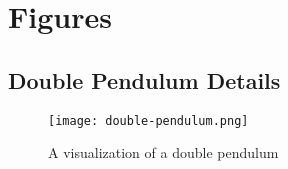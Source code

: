 \section{Figures}\label{sec:figures}

\subsection{Double Pendulum Details}\label{subsec:double-pendulum-details}
\begin{figure}[H]
    \centering
    \texttt{[image: double-pendulum.png]}
    \caption{A visualization of a double pendulum}
    \label{fig:1}
\end{figure}

